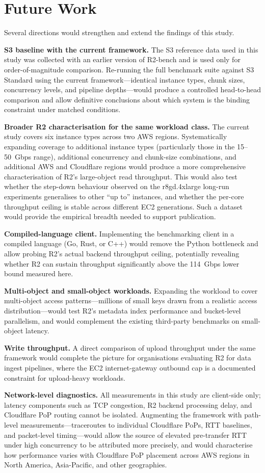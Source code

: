 \section{Future Work}

Several directions would strengthen and extend the findings of this study.

\textbf{S3 baseline with the current framework.} The S3 reference data used in this study was collected with an earlier version of R2-bench and is used only for order-of-magnitude comparison. Re-running the full benchmark suite against S3 Standard using the current framework---identical instance types, chunk sizes, concurrency levels, and pipeline depths---would produce a controlled head-to-head comparison and allow definitive conclusions about which system is the binding constraint under matched conditions.

\textbf{Broader R2 characterisation for the same workload class.} The current study covers six instance types across two AWS regions. Systematically expanding coverage to additional instance types (particularly those in the 15--50~Gbps range), additional concurrency and chunk-size combinations, and additional AWS and Cloudflare regions would produce a more comprehensive characterisation of R2's large-object read throughput. This would also test whether the step-down behaviour observed on the r8gd.4xlarge long-run experiments generalises to other ``up to'' instances, and whether the per-core throughput ceiling is stable across different EC2 generations. Such a dataset would provide the empirical breadth needed to support publication.

\textbf{Compiled-language client.} Implementing the benchmarking client in a compiled language (Go, Rust, or C++) would remove the Python bottleneck and allow probing R2's actual backend throughput ceiling, potentially revealing whether R2 can sustain throughput significantly above the 114~Gbps lower bound measured here.

\textbf{Multi-object and small-object workloads.} Expanding the workload to cover multi-object access patterns---millions of small keys drawn from a realistic access distribution---would test R2's metadata index performance and bucket-level parallelism, and would complement the existing third-party benchmarks on small-object latency.

\textbf{Write throughput.} A direct comparison of upload throughput under the same framework would complete the picture for organisations evaluating R2 for data ingest pipelines, where the EC2 internet-gateway outbound cap is a documented constraint for upload-heavy workloads.

\textbf{Network-level diagnostics.} All measurements in this study are client-side only; latency components such as TCP congestion, R2 backend processing delay, and Cloudflare PoP routing cannot be isolated. Augmenting the framework with path-level measurements---traceroutes to individual Cloudflare PoPs, RTT baselines, and packet-level timing---would allow the source of elevated pre-transfer RTT under high concurrency to be attributed more precisely, and would characterise how performance varies with Cloudflare PoP placement across AWS regions in North America, Asia-Pacific, and other geographies.
